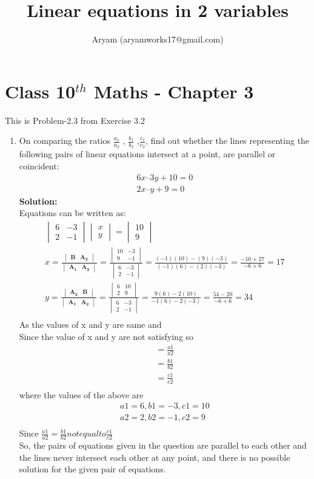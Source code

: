 \documentclass[10pt]{article}
\title{Linear equations in 2 variables}
\author{Aryam (aryamworks17@gmail.com)}
\newcommand{\mydet}[1]{\ensuremath{\begin{vmatrix}#1\end{vmatrix}}}
\newcommand{\solution}{\noindent \textbf{Solution: }}
\let\vec\mathbf
\begin{document}
\maketitle
\section*{Class 10$^{th}$ Maths - Chapter 3}
This is Problem-2.3 from Exercise 3.2
\begin{enumerate}
\item On comparing the ratios $\frac{a_1}{a_2}$ , $\frac{b_1}{b_2}$ ,$\frac{c_1}{c_2}$, find out whether the lines representing the following pairs of linear equations intersect at a point, are parallel or coincident:\\
\begin{align}
6x–3y +10=0\\
2x–y+9=0
\end{align}
\solution \\
Equations can be written as:\\
\begin{align}
\mydet{6&-3\\2&-1} \mydet{x\\y}= \mydet{10\\9}\\
 x= \frac{\mydet{\vec{B}&\vec {A_2}}}{\mydet{\vec{A_1}&\vec{A_2}}}
=\frac{\mydet{10&-3\\9&-1}}{\mydet{6&-3\\2&-1}}
=\frac{{(-1)(10) - (9)(-3)}}{{(-1)(6) - (2)(-3)}}
=\frac{-10+27}{-6+6}
=17\\
 y= \frac{\mydet{\vec{A_2}&\vec {B}}}{\mydet{\vec{A_1}&\vec{A_2}}}
=\frac{\mydet{6&10\\2&9}}{\mydet{6&-3\\2&-1}}
=\frac{9(6) - 2(10)}{-1(6) -2(-3)}
=\frac{54-20}{-6+6}
=34\\
\end{align}
As the values of x and y are same and\\
Since the value of x and y are not satisfying so\\
\begin{align}
=\frac{a1}{a2}\\
=\frac{b1}{b2}\\
=\frac{c1}{c2}\\
\end{align}
where the values of the above are\\
\begin{align}
a1 = 6, b1 = -3, c1 = 10\\
a2 = 2, b2 = -1, c2 = 9\\
\end{align}
Since $\frac{a1}{a2}    =     \frac{b1}{b2} not    equal    to    \frac{c1}{c2}$ \\

So, the pairs of equations given in the question are parallel to each other and the lines never intersect each other at any point, and there is no possible solution for the given pair of equations.\\
\end{enumerate}
\end{document}
